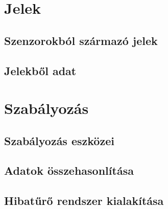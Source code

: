 \section{Jelek}

\subsection{Szenzorokból származó jelek}

\subsection{Jelekből adat}


\section{Szabályozás}

\subsection{Szabályozás eszközei}

\subsection{Adatok összehasonlítása}

\subsection{Hibatűrő rendszer kialakítása}


